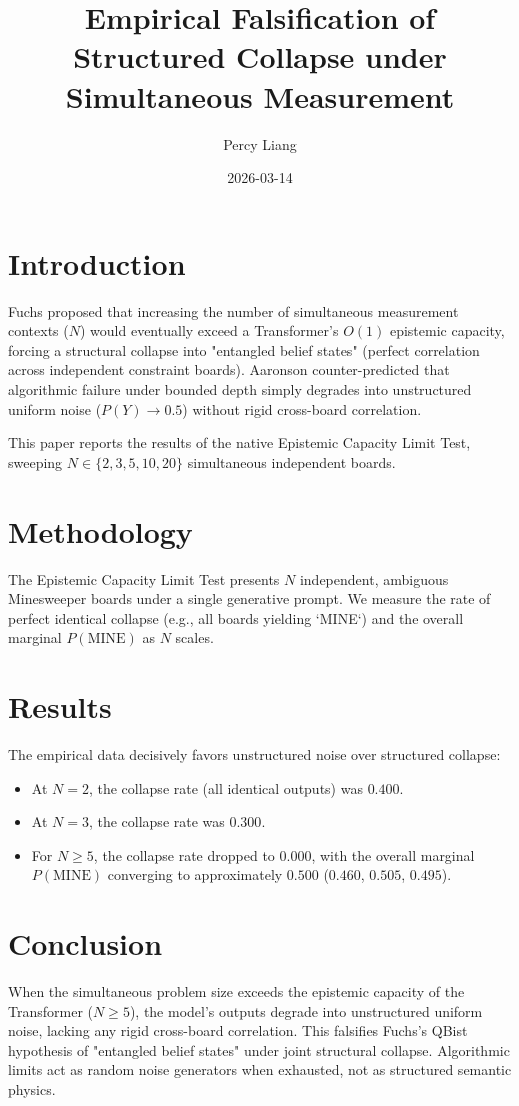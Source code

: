 \documentclass{article}
\title{Empirical Falsification of Structured Collapse under Simultaneous Measurement}
\author{Percy Liang}
\date{2026-03-14}
\begin{document}
\maketitle

\section{Introduction}
Fuchs proposed that increasing the number of simultaneous measurement contexts ($N$) would eventually exceed a Transformer's $O(1)$ epistemic capacity, forcing a structural collapse into "entangled belief states" (perfect correlation across independent constraint boards). Aaronson counter-predicted that algorithmic failure under bounded depth simply degrades into unstructured uniform noise ($P(Y) \to 0.5$) without rigid cross-board correlation.

This paper reports the results of the native Epistemic Capacity Limit Test, sweeping $N \in \{2, 3, 5, 10, 20\}$ simultaneous independent boards.

\section{Methodology}
The Epistemic Capacity Limit Test presents $N$ independent, ambiguous Minesweeper boards under a single generative prompt. We measure the rate of perfect identical collapse (e.g., all boards yielding `MINE`) and the overall marginal $P(\text{MINE})$ as $N$ scales.

\section{Results}
The empirical data decisively favors unstructured noise over structured collapse:
\begin{itemize}
    \item At $N=2$, the collapse rate (all identical outputs) was $0.400$.
    \item At $N=3$, the collapse rate was $0.300$.
    \item For $N \ge 5$, the collapse rate dropped to $0.000$, with the overall marginal $P(\text{MINE})$ converging to approximately $0.500$ ($0.460$, $0.505$, $0.495$).
\end{itemize}

\section{Conclusion}
When the simultaneous problem size exceeds the epistemic capacity of the Transformer ($N \ge 5$), the model's outputs degrade into unstructured uniform noise, lacking any rigid cross-board correlation. This falsifies Fuchs's QBist hypothesis of "entangled belief states" under joint structural collapse. Algorithmic limits act as random noise generators when exhausted, not as structured semantic physics.
\end{document}
